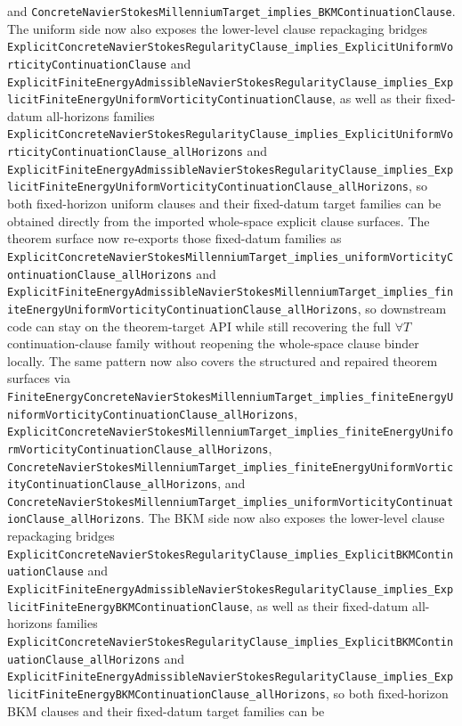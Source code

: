 \documentclass[11pt]{article}
\begin{document}
and
\texttt{ConcreteNavierStokesMillenniumTarget\_implies\_BKMContinuationClause}.
The uniform side now also exposes the lower-level clause repackaging bridges
\texttt{ExplicitConcreteNavierStokesRegularityClause\_implies\_ExplicitUniformVorticityContinuationClause}
and
\texttt{ExplicitFiniteEnergyAdmissibleNavierStokesRegularityClause\_implies\_ExplicitFiniteEnergyUniformVorticityContinuationClause},
as well as their fixed-datum all-horizons families
\texttt{ExplicitConcreteNavierStokesRegularityClause\_implies\_ExplicitUniformVorticityContinuationClause\_allHorizons}
and
\texttt{ExplicitFiniteEnergyAdmissibleNavierStokesRegularityClause\_implies\_ExplicitFiniteEnergyUniformVorticityContinuationClause\_allHorizons},
so both fixed-horizon uniform clauses and their fixed-datum target families can
be obtained directly from the imported whole-space explicit clause surfaces.
The theorem surface now re-exports those fixed-datum families as
\texttt{ExplicitConcreteNavierStokesMillenniumTarget\_implies\_uniformVorticityContinuationClause\_allHorizons}
and
\texttt{ExplicitFiniteEnergyAdmissibleNavierStokesMillenniumTarget\_implies\_finiteEnergyUniformVorticityContinuationClause\_allHorizons},
so downstream code can stay on the theorem-target API while still recovering
the full $\forall T$ continuation-clause family without reopening the
whole-space clause binder locally.  The same pattern now also covers the
structured and repaired theorem surfaces via
\texttt{FiniteEnergyConcreteNavierStokesMillenniumTarget\_implies\_finiteEnergyUniformVorticityContinuationClause\_allHorizons},
\texttt{ExplicitConcreteNavierStokesMillenniumTarget\_implies\_finiteEnergyUniformVorticityContinuationClause\_allHorizons},
\texttt{ConcreteNavierStokesMillenniumTarget\_implies\_finiteEnergyUniformVorticityContinuationClause\_allHorizons},
and
\texttt{ConcreteNavierStokesMillenniumTarget\_implies\_uniformVorticityContinuationClause\_allHorizons}.
The BKM side now also exposes the lower-level clause repackaging bridges
\texttt{ExplicitConcreteNavierStokesRegularityClause\_implies\_ExplicitBKMContinuationClause}
and
\texttt{ExplicitFiniteEnergyAdmissibleNavierStokesRegularityClause\_implies\_ExplicitFiniteEnergyBKMContinuationClause},
as well as their fixed-datum all-horizons families
\texttt{ExplicitConcreteNavierStokesRegularityClause\_implies\_ExplicitBKMContinuationClause\_allHorizons}
and
\texttt{ExplicitFiniteEnergyAdmissibleNavierStokesRegularityClause\_implies\_ExplicitFiniteEnergyBKMContinuationClause\_allHorizons},
so both fixed-horizon BKM clauses and their fixed-datum target families can be
\end{document}
